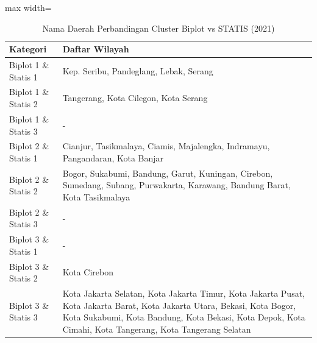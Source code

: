 \begin{table}[H]
\centering
\caption{Nama Daerah Perbandingan Cluster Biplot vs STATIS (2021)} \label{tab:appbiplot_statis_comp_name_2021}
\begin{adjustbox}{max width=\textwidth}
\begin{tabular}{|p{4cm}|p{10cm}|}
\hline
\textbf{Kategori} & \textbf{Daftar Wilayah} \\
\hline
Biplot 1 \& Statis 1 & Kep. Seribu, Pandeglang, Lebak, Serang \\
\hline
Biplot 1 \& Statis 2 & Tangerang, Kota Cilegon, Kota Serang \\
\hline
Biplot 1 \& Statis 3 & - \\
\hline
Biplot 2 \& Statis 1 & Cianjur, Tasikmalaya, Ciamis, Majalengka, Indramayu, Pangandaran, Kota Banjar \\
\hline
Biplot 2 \& Statis 2 & Bogor, Sukabumi, Bandung, Garut, Kuningan, Cirebon, Sumedang, Subang, Purwakarta, Karawang, Bandung Barat, Kota Tasikmalaya \\
\hline
Biplot 2 \& Statis 3 & - \\
\hline
Biplot 3 \& Statis 1 & - \\
\hline
Biplot 3 \& Statis 2 & Kota Cirebon \\
\hline
Biplot 3 \& Statis 3 & Kota Jakarta Selatan, Kota Jakarta Timur, Kota Jakarta Pusat, Kota Jakarta Barat, Kota Jakarta Utara, Bekasi, Kota Bogor, Kota Sukabumi, Kota Bandung, Kota Bekasi, Kota Depok, Kota Cimahi, Kota Tangerang, Kota Tangerang Selatan \\
\hline
\end{tabular}
\end{adjustbox}
\end{table}